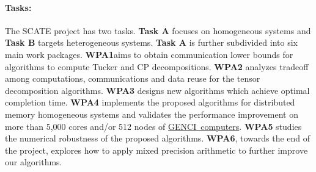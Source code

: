 \documentclass[a4paper,11pt]{article}
\begin{document}

		
	
	

	
	\vspace*{-0.25cm}\paragraph{Tasks:} The SCATE project has two tasks. \textbf{Task A} focuses on homogeneous systems and \textbf{Task B} targets heterogeneous systems. \textbf{Task A} is further subdivided into six main work packages. \textbf{WPA1}\newline aims to obtain communication lower bounds for algorithms to compute Tucker and CP decompositions. \textbf{WPA2} analyzes tradeoff among computations, communications and data reuse for the tensor decomposition algorithms. \textbf{WPA3} designs new algorithms which achieve optimal completion time. \textbf{WPA4} implements the proposed algorithms for distributed memory homogeneous systems and validates the performance improvement on more than 5,000 cores and/or 512 nodes of \mbox{\href{https://www.genci.fr/en/our-computers}{GENCI computers}}. \textbf{WPA5} studies the numerical robustness of the proposed algorithms.
	\textbf{WPA6}, towards the end of the project, explores how to apply mixed precision arithmetic to further improve our algorithms.
	
\end{document}
